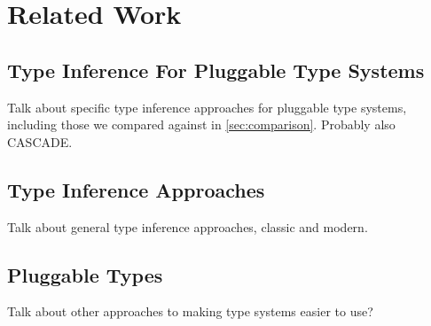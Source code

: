 \section{Related Work}
\label{sec:relatedwork}

\subsection{Type Inference For Pluggable Type Systems}
\label{sec:rw:type-inference-pluggable}

Talk about specific type inference approaches for pluggable type systems, including those we
compared against in \cref{sec:comparison}. Probably also CASCADE.

\subsection{Type Inference Approaches}
\label{sec:rw:type-inference}

Talk about general type inference approaches, classic and modern.

\subsection{Pluggable Types}
\label{sec:pluggable}

Talk about other approaches to making type systems easier to use?

